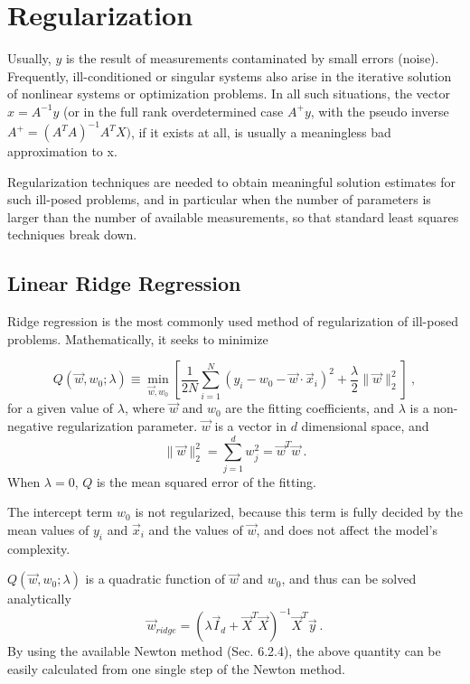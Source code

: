 \section{Regularization} %
\label{sub:regularization}

Usually, $y$ is the result of measurements contaminated by small errors
(noise). Frequently, ill-conditioned or singular systems also arise in the iterative solution of nonlinear systems or optimization problems. In all such situations, the vector $x = {A}^{-1}y$ (or in the full rank overdetermined
case $A^+ y$, with the pseudo inverse $A^+ = (A^T A)^{-1}A^T X)$, if it exists at all, is usually a meaningless bad approximation to x.

Regularization techniques are needed to obtain meaningful solution estimates 
for such ill-posed problems, and in particular when the number of parameters 
is larger than the number of available measurements, so that standard least 
squares techniques break down.

\subsection{Linear Ridge Regression}
Ridge regression is the most commonly used method of regularization of
ill-posed problems. Mathematically, it seeks to minimize

\begin{equation}
Q\left(\vec{w},w_0;\lambda\right)\equiv \min_{\vec{w},w_0}\left[ \frac{1}{2N} \sum_{i=1}^{N} \left( y_i - w_0 -
    \vec{w} \cdot \vec{x}_i \right)^2
  +\frac{\lambda}{2}\|\vec{w}\|_2^2 \right]\ ,
\end{equation}
for a given value of $\lambda$, where $\vec{w}$ and $w_0$ are the fitting coefficients, and $\lambda$
is a non-negative regularization parameter. $\vec{w}$ is a vector in
$d$ dimensional space, and
\begin{equation}
\|\vec{w}\|_2^2 = \sum_{j=1}^{d}w_j^2 = \vec{w}^T\vec{w}\ .
\end{equation}
When $\lambda = 0$, $Q$ is
the mean squared error of the fitting.

The intercept term $w_0$ is not regularized, because this term is
fully decided by the mean values of $y_i$ and $\vec{x}_i$ and the
values of $\vec{w}$, and does not affect the model's complexity.

$Q\left(\vec{w},w_0;\lambda\right)$ is a quadratic function of $\vec{w}$ and
  $w_0$, and thus can be solved analytically
\begin{equation}
\vec{w}_{ridge}=\left(\lambda\vec{I}_d +
  \vec{X}^T\vec{X}\right)^{-1}\vec{X}^T\vec{y}\ .
\end{equation}
By using the available Newton method (Sec. 6.2.4), the above quantity can be easily
calculated from one single step of the Newton method.


